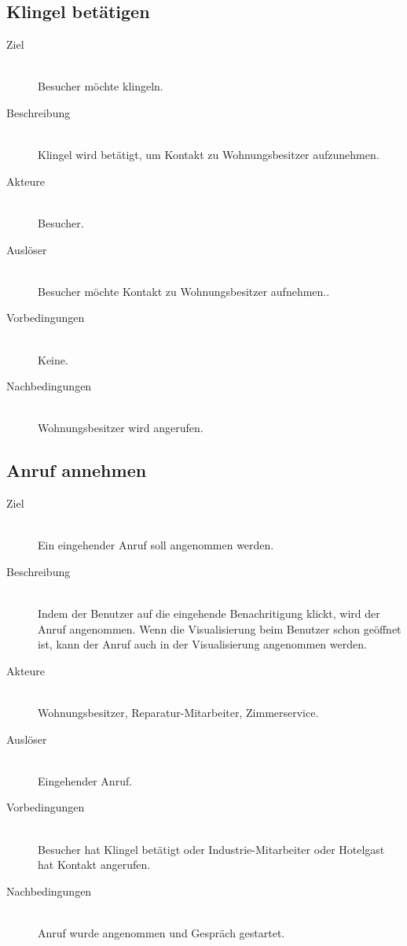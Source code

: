 \subsection{Klingel betätigen}\label{subsec:klingel-betatigen}
    \begin{description}
        \item[Ziel]\hfill \\
        Besucher möchte klingeln.
        \item[Beschreibung]\hfill \\
        Klingel wird betätigt, um Kontakt zu Wohnungsbesitzer aufzunehmen.
        \item[Akteure]\hfill \\
        Besucher.
        \item[Auslöser]\hfill \\
        Besucher möchte Kontakt zu Wohnungsbesitzer aufnehmen..
        \item[Vorbedingungen]\hfill \\
        Keine.
        \item[Nachbedingungen]\hfill \\
        Wohnungsbesitzer wird angerufen.
        \end{description}

\subsection{Anruf annehmen}\label{subsec:anruf-annehmen}
    \begin{description}
        \item[Ziel]\hfill \\
        Ein eingehender Anruf soll angenommen werden.
        \item[Beschreibung]\hfill \\
        Indem der Benutzer auf die eingehende Benachritigung klickt, wird der Anruf angenommen.
        Wenn die Visualisierung beim Benutzer schon geöffnet ist, kann der Anruf auch in der Visualisierung angenommen werden.
        \item[Akteure]\hfill \\
        Wohnungsbesitzer, Reparatur-Mitarbeiter, Zimmerservice.
        \item[Auslöser]\hfill \\
        Eingehender Anruf.
        \item[Vorbedingungen]\hfill \\
        Besucher hat Klingel betätigt oder Industrie-Mitarbeiter oder Hotelgast hat Kontakt angerufen.
        \item[Nachbedingungen]\hfill \\
        Anruf wurde angenommen und Gespräch gestartet.
        \end{description}

